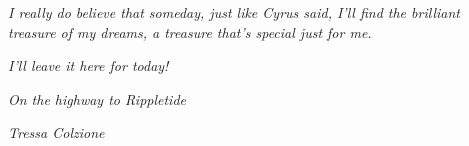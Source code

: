 \emph{I really do believe that someday, just like Cyrus said, I'll find the brilliant treasure of my dreams, a treasure that's special just for me.}

\emph{I'll leave it here for today!}

\begin{flushright}
\emph{On the highway to Rippletide}

\emph{Tressa Colzione}
\end{flushright}

